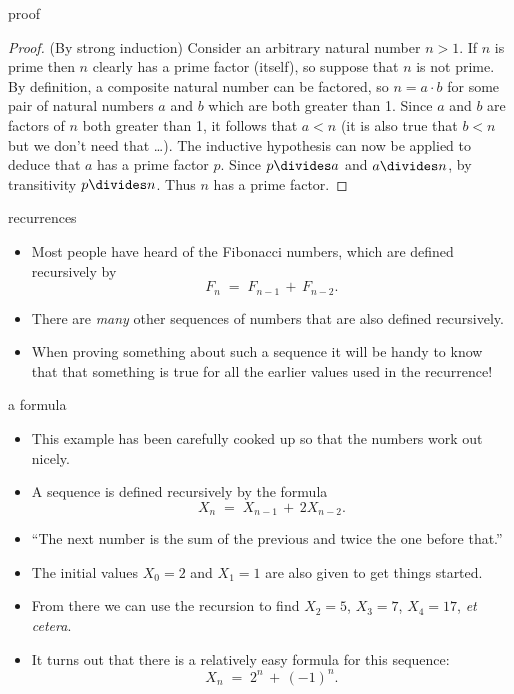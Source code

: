 \documentclass[handout,landscape]{beamer}
\begin{document}
\begin{frame}{proof}
\begin{proof} (By strong induction)
Consider an arbitrary natural number $n>1$.  If $n$ is prime then $n$ clearly
has a prime factor (itself), so suppose that $n$ is not prime.  By 
definition, a composite
natural number can be factored, so $n=a \cdot b$ for some pair of natural
numbers $a$ and $b$ which are both greater than 1.  Since $a$ and $b$ are  
factors of $n$ both greater than 1, it follows that $a < n$ (it is also 
true that $b < n$ but we don't need that \ldots).  The inductive hypothesis
can now be applied to deduce that $a$ has a prime factor $p$.  Since
$p \divides a$ and $a \divides n$, by transitivity $p \divides n$.  Thus
$n$ has a prime factor.
\end{proof}
\end{frame}

\begin{frame}{recurrences}
\begin{itemize}
\item Most people have heard of the Fibonacci numbers, which are defined recursively by 
\[ F_{n} \; = \; F_{n-1} \, + \, F_{n-2}. \] \pause
\item There are {\em many} other sequences of numbers that are also defined recursively. \pause
\item When proving something about such a sequence it will be handy to know that that something is true for all the earlier values used in the recurrence! \pause 
\end{itemize}
\end{frame}

\begin{frame}{a formula}
\begin{itemize}
\item This example has been carefully cooked up so that the numbers work out nicely.\pause
\item A sequence is defined recursively by the formula
\[ X_n \; = \; X_{n-1} \, + \, 2X_{n-2}. \] \pause
\item ``The next number is the sum of the previous and twice the one before that.''
\item The initial values $X_0 = 2$ and $X_1 = 1$ are also given to get things started. \pause
\item From there we can use the recursion to find $X_2 = 5$, $X_3 = 7$, $X_4 = 17$, {\em et cetera}. \pause
\item It turns out that there is a relatively easy formula for this sequence: \pause
\[ X_n \; = \; 2^n \, + \, (-1)^n. \]

\end{itemize}
\end{frame}
\end{document}

